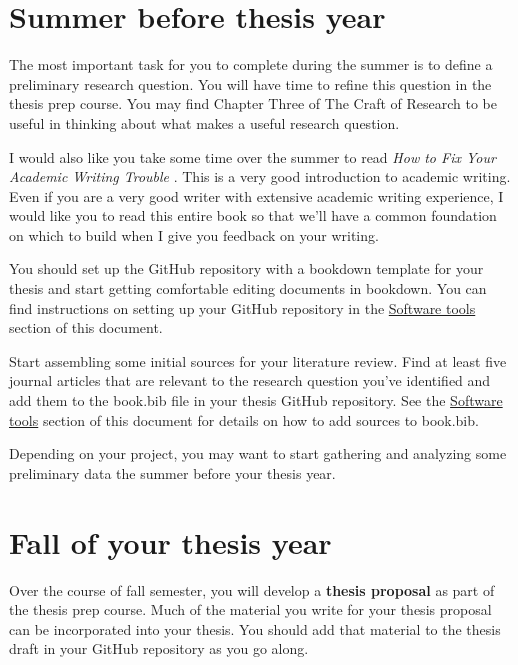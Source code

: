 \documentclass[]{tufte-book}
\begin{document}
\hypertarget{summer-before-thesis-year}{%
\section{Summer before thesis year}\label{summer-before-thesis-year}}

The most important task for you to complete during the summer is to define a preliminary research question. You will have time to refine this question in the thesis prep course. You may find Chapter Three of The Craft of Research \citep{booth_chapter_2016} to be useful in thinking about what makes a useful research question.

I would also like you take some time over the summer to read \emph{How to Fix Your Academic Writing Trouble} \citep{mewburn2018ebook}. This is a very good introduction to academic writing. Even if you are a very good writer with extensive academic writing experience, I would like you to read this entire book so that we'll have a common foundation on which to build when I give you feedback on your writing.

You should set up the GitHub repository with a bookdown template for your thesis and start getting comfortable editing documents in bookdown. You can find instructions on setting up your GitHub repository in the \protect\hyperlink{software-tools}{Software tools} section of this document.

Start assembling some initial sources for your literature review. Find at least five journal articles that are relevant to the research question you've identified and add them to the book.bib file in your thesis GitHub repository. See the \protect\hyperlink{software-tools}{Software tools} section of this document for details on how to add sources to book.bib.

Depending on your project, you may want to start gathering and analyzing some preliminary data the summer before your thesis year.

\hypertarget{fall-of-your-thesis-year}{%
\section{Fall of your thesis year}\label{fall-of-your-thesis-year}}

Over the course of fall semester, you will develop a \textbf{thesis proposal} as part of the thesis prep course. Much of the material you write for your thesis proposal can be incorporated into your thesis. You should add that material to the thesis draft in your GitHub repository as you go along.
\end{document}
